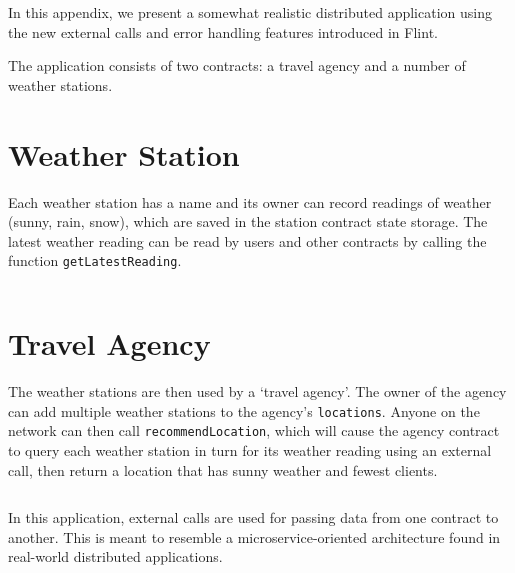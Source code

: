 In this appendix, we present a somewhat realistic distributed application using the new external calls and error handling features introduced in Flint.

The application consists of two contracts: a travel agency and a number of weather stations.

\section{Weather Station}

Each weather station has a name and its owner can record readings of weather (sunny, rain, snow), which are saved in the station contract state storage. The latest weather reading can be read by users and other contracts by calling the function \texttt{getLatestReading}.

\inputminted{swift}{code/appendix-b-station.flint}

\section{Travel Agency}

The weather stations are then used by a `travel agency'. The owner of the agency can add multiple weather stations to the agency's \texttt{locations}. Anyone on the network can then call \texttt{recommendLocation}, which will cause the agency contract to query each weather station in turn for its weather reading using an external call, then return a location that has sunny weather and fewest clients.

\inputminted{swift}{code/appendix-b-agency.flint}

In this application, external calls are used for passing data from one contract to another. This is meant to resemble a microservice-oriented architecture found in real-world distributed applications.
